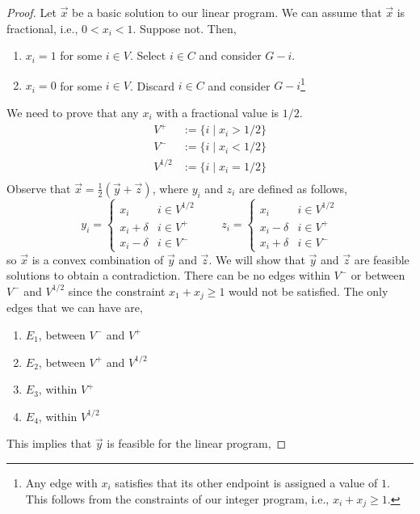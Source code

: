 \begin{proof}
	Let $\Vec{x}$ be a basic solution to our linear program. We can assume that $\Vec{x}$ is fractional, i.e., $0 < x_i < 1$. Suppose not. Then,
	\begin{enumerate}
		\item $x_i = 1$ for some $i \in V$. Select $i \in C$ and consider $G - i$.
		\item $x_i = 0$ for some $i \in V$. Discard $i \in C$ and consider $G - i$\footnote{Any edge with $x_i$ satisfies that its other endpoint is assigned a value of $1$. This follows from the constraints of our integer program, i.e., $x_i + x_j \geq 1$.}
	\end{enumerate}
	\noindent We need to prove that any $x_i$ with a fractional value is $1/2$. 
	\begin{align*}
		V^+ &:= \{i \mid x_i > 1/2\} \\
		V^- &:= \{i \mid x_i < 1/2\} \\
		V^{1/2} &:= \{i \mid x_i = 1/2\} \\
	\end{align*}
	\noindent Observe that $\Vec{x} = \frac{1}{2}(\Vec{y} + \Vec{z})$, where $y_i$ and $z_i$ are defined as follows,
	\[y_{i}=\begin{cases}
			x_{i} & i \in V^{1/2} \\
			x_{i}+\delta & i \in V^{+} \\
			x_{i}-\delta & i \in V^{-}
			\end{cases}
	\quad\quad
	 z_{i} = \begin{cases}x_{i} & i \in V^{1/2} \\
			x_{i}-\delta & i \in V^{+} \\
			x_{i}+\delta & i \in V^{-}\end{cases}\]
	\noindent so $\Vec{x}$ is a convex combination of $\Vec{y}$ and $\Vec{z}$. We will show that $\Vec{y}$ and $\Vec{z}$ are feasible solutions to obtain a contradiction. There can be no edges within $V^-$ or between $V^-$ and $V^{1/2}$ since the constraint $x_1 + x_j \geq 1$ would not be satisfied. The only edges that we can have are,
	\begin{enumerate}
	 	\item $E_1$, between $V^-$ and $V^+$
	 	\item $E_2$, between $V^+$ and $V^{1/2}$
	 	\item $E_3$, within $V^+$ 
	 	\item $E_4$, within $V^{1/2}$
	 \end{enumerate} 
	 \noindent This implies that $\Vec{y}$ is feasible for the linear program,

\end{proof}
